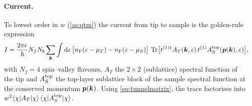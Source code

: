 \paragraph{Current.} To lowest order in $w$ (\cref{as:qtm}) the current from tip to sample is the golden-rule
expression
\begin{equation}
I=\frac{2\pi e}{\hbar}N_fN_b\sum_{\bm k}\int\mathrm d\varepsilon\,
\bigl[n_{\rm F}(\varepsilon-\mu_T)-n_{\rm F}(\varepsilon-\mu_S)\bigr]\,
\operatorname{Tr}\bigl[t^{(1)\dagger}A_T(\bm k,\varepsilon)\,t^{(1)}A^{\rm top}_S(\bm p(\bm k),\varepsilon)\bigr],
\label{eq:current}
\end{equation}
with $N_f=4$ spin--valley flavours, $A_T$ the $2\times2$ (sublattice) spectral function of the tip and
$A_S^{\rm top}$ the top-layer sublattice block of the sample spectral function at the conserved momentum
$\bm p(\bm k)$. Using \cref{eq:tunnelmatrix}, the trace factorises into $w^2\langle \chi| A_T|\chi\rangle\,\langle \chi| A^{\rm top}_S|\chi\rangle$.

